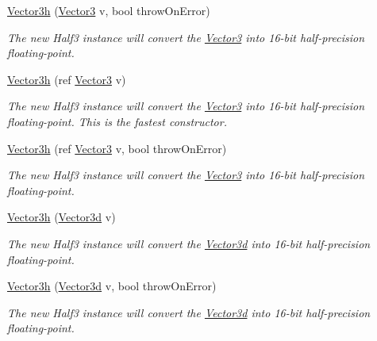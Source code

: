 \begin{DoxyCompactItemize}
\hyperlink{struct_open_t_k_1_1_vector3h_aa5178fc0ce4195febaaa202879056774}{Vector3h} (\hyperlink{struct_open_t_k_1_1_vector3}{Vector3} v, bool throw\-On\-Error)
\begin{DoxyCompactList}\small\item\em The new Half3 instance will convert the \hyperlink{struct_open_t_k_1_1_vector3}{Vector3} into 16-\/bit half-\/precision floating-\/point. \end{DoxyCompactList}\item 
\hyperlink{struct_open_t_k_1_1_vector3h_ae32c28c5662f9df87f7cccb1e3ead242}{Vector3h} (ref \hyperlink{struct_open_t_k_1_1_vector3}{Vector3} v)
\begin{DoxyCompactList}\small\item\em The new Half3 instance will convert the \hyperlink{struct_open_t_k_1_1_vector3}{Vector3} into 16-\/bit half-\/precision floating-\/point. This is the fastest constructor. \end{DoxyCompactList}\item 
\hyperlink{struct_open_t_k_1_1_vector3h_a26c187f21a57843adafefb24f449f84d}{Vector3h} (ref \hyperlink{struct_open_t_k_1_1_vector3}{Vector3} v, bool throw\-On\-Error)
\begin{DoxyCompactList}\small\item\em The new Half3 instance will convert the \hyperlink{struct_open_t_k_1_1_vector3}{Vector3} into 16-\/bit half-\/precision floating-\/point. \end{DoxyCompactList}\item 
\hyperlink{struct_open_t_k_1_1_vector3h_ada7cb6311a11bb15b80f1debac209793}{Vector3h} (\hyperlink{struct_open_t_k_1_1_vector3d}{Vector3d} v)
\begin{DoxyCompactList}\small\item\em The new Half3 instance will convert the \hyperlink{struct_open_t_k_1_1_vector3d}{Vector3d} into 16-\/bit half-\/precision floating-\/point. \end{DoxyCompactList}\item 
\hyperlink{struct_open_t_k_1_1_vector3h_ab45ddaa75353852dc4c2c70acffd8944}{Vector3h} (\hyperlink{struct_open_t_k_1_1_vector3d}{Vector3d} v, bool throw\-On\-Error)
\begin{DoxyCompactList}\small\item\em The new Half3 instance will convert the \hyperlink{struct_open_t_k_1_1_vector3d}{Vector3d} into 16-\/bit half-\/precision floating-\/point. \end{DoxyCompactList}\item 

\end{DoxyCompactItemize}
